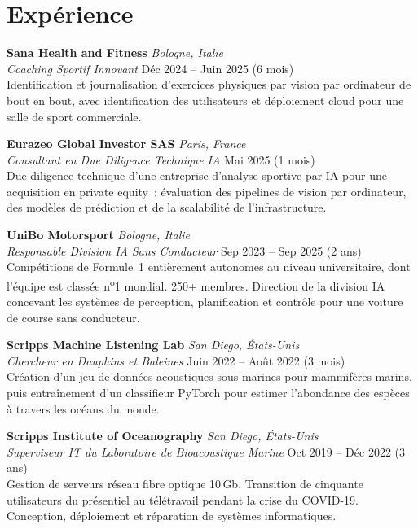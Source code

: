 \documentclass[11pt,a4paper]{article}
\begin{document}
\section{Expérience}

\textbf{Sana Health and Fitness} \hfill \textit{Bologne, Italie}\\
\textit{Coaching Sportif Innovant} \hfill Déc 2024 -- Juin 2025 (6 mois)\\
Identification et journalisation d'exercices physiques par vision par ordinateur de bout en bout, avec identification des utilisateurs et déploiement cloud pour une salle de sport commerciale.

\vspace{0.4em}
\textbf{Eurazeo Global Investor SAS} \hfill \textit{Paris, France}\\
\textit{Consultant en Due Diligence Technique IA} \hfill Mai 2025 (1 mois)\\
Due diligence technique d'une entreprise d'analyse sportive par IA pour une acquisition en private equity~: évaluation des pipelines de vision par ordinateur, des modèles de prédiction et de la scalabilité de l'infrastructure.

\vspace{0.4em}
\textbf{UniBo Motorsport} \hfill \textit{Bologne, Italie}\\
\textit{Responsable Division IA Sans Conducteur} \hfill Sep 2023 -- Sep 2025 (2 ans)\\
Compétitions de Formule~1 entièrement autonomes au niveau universitaire, dont l'équipe est classée n\textsuperscript{o}1 mondial. 250+ membres. Direction de la division IA concevant les systèmes de perception, planification et contrôle pour une voiture de course sans conducteur.

\vspace{0.4em}
\textbf{Scripps Machine Listening Lab} \hfill \textit{San Diego, États-Unis}\\
\textit{Chercheur en Dauphins et Baleines} \hfill Juin 2022 -- Août 2022 (3 mois)\\
Création d'un jeu de données acoustiques sous-marines pour mammifères marins, puis entraînement d'un classifieur PyTorch pour estimer l'abondance des espèces à travers les océans du monde.

\vspace{0.4em}
\textbf{Scripps Institute of Oceanography} \hfill \textit{San Diego, États-Unis}\\
\textit{Superviseur IT du Laboratoire de Bioacoustique Marine} \hfill Oct 2019 -- Déc 2022 (3 ans)\\
Gestion de serveurs réseau fibre optique 10\,Gb. Transition de cinquante utilisateurs du présentiel au télétravail pendant la crise du COVID-19. Conception, déploiement et réparation de systèmes informatiques.
\end{document}
